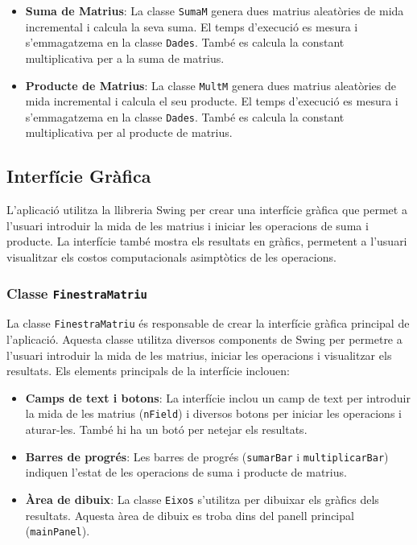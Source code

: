 \documentclass{ieeetj}
\begin{document}
\begin{itemize}
    \item \textbf{Suma de Matrius}: La classe \texttt{SumaM} genera dues matrius aleatòries de mida incremental i calcula la seva suma. El temps d'execució es mesura i s'emmagatzema en la classe \texttt{Dades}. També es calcula la constant multiplicativa per a la suma de matrius.
    \item \textbf{Producte de Matrius}: La classe \texttt{MultM} genera dues matrius aleatòries de mida incremental i calcula el seu producte. El temps d'execució es mesura i s'emmagatzema en la classe \texttt{Dades}. També es calcula la constant multiplicativa per al producte de matrius.
\end{itemize}

\subsection{Interfície Gràfica}
L'aplicació utilitza la llibreria Swing per crear una interfície gràfica que permet a l'usuari introduir la mida de les matrius i iniciar les operacions de suma i producte. La interfície també mostra els resultats en gràfics, permetent a l'usuari visualitzar els costos computacionals asimptòtics de les operacions.

\subsubsection{Classe \texttt{FinestraMatriu}}
La classe \texttt{FinestraMatriu} és responsable de crear la interfície gràfica principal de l'aplicació. Aquesta classe utilitza diversos components de Swing per permetre a l'usuari introduir la mida de les matrius, iniciar les operacions i visualitzar els resultats. Els elements principals de la interfície inclouen:

\begin{itemize}
    \item \textbf{Camps de text i botons}: La interfície inclou un camp de text per introduir la mida de les matrius (\texttt{nField}) i diversos botons per iniciar les operacions i aturar-les. També hi ha un botó per netejar els resultats.
    \item \textbf{Barres de progrés}: Les barres de progrés (\texttt{sumarBar} i \texttt{multiplicarBar}) indiquen l'estat de les operacions de suma i producte de matrius.
    \item \textbf{Àrea de dibuix}: La classe \texttt{Eixos} s'utilitza per dibuixar els gràfics dels resultats. Aquesta àrea de dibuix es troba dins del panell principal (\texttt{mainPanel}).
\end{itemize}
\end{document}
